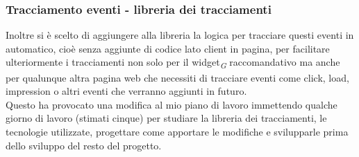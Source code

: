 \documentclass[a4paper, 12pt, twoside, openright]{book}
\newcommand{\gloss}[1]{#1\textsubscript{\textit{\tiny{G}}}}
\begin{document}
\subsubsection{Tracciamento eventi - libreria dei tracciamenti}
Inoltre si è scelto di aggiungere alla libreria la logica per tracciare questi eventi in automatico, cioè senza aggiunte di codice lato client in pagina, per facilitare ulteriormente i tracciamenti non solo per il \gloss{widget} raccomandativo ma anche per qualunque altra pagina web che necessiti di tracciare eventi come click, load, impression o altri eventi che verranno aggiunti in futuro.\\
Questo ha provocato una modifica al mio piano di lavoro immettendo qualche giorno di lavoro (stimati cinque) per studiare la libreria dei tracciamenti, le tecnologie utilizzate, progettare come apportare le modifiche e svilupparle prima dello sviluppo del resto del progetto.\\
\end{document}
